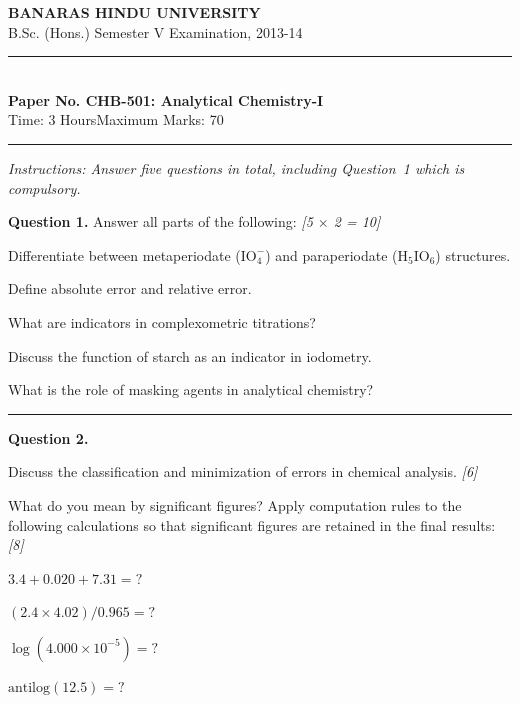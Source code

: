 \documentclass[11pt,a4paper]{article}
\newcommand{\pts}[1]{\hfill   \textit{[#1]}}
\begin{document}
\begin{center}
  {\large\bfseries BANARAS HINDU UNIVERSITY}\\[2pt]
  {\normalsize B.Sc. (Hons.) Semester V Examination, 2013-14}\\[6pt]
  \rule{0.8\linewidth}{0.5pt}\\[6pt]
  {\large\bfseries Paper No. CHB-501: Analytical Chemistry-I}\\[4pt]
  {\normalsize Time: 3 Hours\hfill Maximum Marks: 70}
\end{center}
\rule{\linewidth}{0.4pt}
\small



\noindent   \textit{Instructions: Answer five questions in total, including Question~1 which is compulsory.}

\normalsize
\bigskip




\noindent   \textbf{Question 1.} Answer all parts of the following: \pts{5 $ \times$ 2 = 10}

\begin{parts}
  \item Differentiate between metaperiodate ($ \text{IO}_4^-$) and paraperiodate ($ \text{H}_5 \text{IO}_6$) structures.
  \item Define absolute error and relative error.
  \item What are indicators in complexometric titrations?
  \item Discuss the function of starch as an indicator in iodometry.
  \item What is the role of masking agents in analytical chemistry?
\end{parts}

\medskip\rule{\linewidth}{0.2pt}




\noindent   \textbf{Question 2.}

\begin{parts}
  \item Discuss the classification and minimization of errors in chemical analysis. \pts{6}
  \item What do you mean by significant figures? Apply computation rules to the following calculations so that significant figures are retained in the final results: \pts{8}
  
\begin{parts}
    \item $3.4 + 0.020 + 7.31 = ?$
    \item $(2.4  \times 4.02) / 0.965 = ?$
    \item $\log(4.000  \times 10^{-5}) = ?$
    \item $ \text{antilog}(12.5) = ?$
  \end{parts}
\end{parts}
\end{document}
